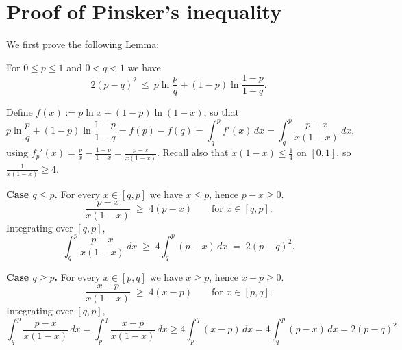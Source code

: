 \documentclass[fontsize=11pt, parskip=half]{scrartcl}
\renewcommand{\thesection}{\arabic{section}}
\begin{document}
\clearpage
\appendix
\renewcommand{\thesection}{\Alph{section}}

\section{Proof of Pinsker's inequality}\label{app:pinsker}

We first prove the following Lemma:

\begin{lemma}\label{lem:pinsker_binary}
    For $0 \leq p \leq 1$ and $0 < q < 1$ we have
    \[
        2(p-q)^2 ~\leq~ p \ln \frac{p}{q} + (1-p) \ln \frac{1-p}{1-q}.
    \]
    \end{lemma}
    
    
    
    
    Define $f(x) := p \ln x + (1-p) \ln (1-x)$, so that
    \[
    p \ln \frac{p}{q} + (1-p) \ln \frac{1-p}{1-q} = f(p) - f(q)
    = \int_q^p f'(x)\, dx
    = \int_q^p \frac{p-x}{x(1-x)}\, dx,
    \]
    using $f_p'(x) = \frac{p}{x} - \frac{1-p}{1-x} = \frac{p-x}{x(1-x)}$. Recall also that $x(1-x) \leq \tfrac14$ on $[0,1]$, so $\frac{1}{x(1-x)} \geq 4$.
    
    \textbf{Case $q \leq p$.} For every $x \in [q,p]$ we have $x \leq p$, hence $p - x \geq 0$.
    \[
    \frac{p-x}{x(1-x)} \;\geq\; 4(p-x) \qquad \text{for } x \in [q,p].
    \]
    Integrating over $[q,p]$,
    \[
    \int_q^p \frac{p-x}{x(1-x)}\, dx \;\geq\; 4 \int_q^p (p-x)\, dx \;=\; 2(p-q)^2.
    \]
    
    \textbf{Case $q \geq p$.} For every $x \in [p,q]$ we have $x \geq p$, hence $x - p \geq 0$. 
    \[
    \frac{x-p}{x(1-x)} \;\geq\; 4(x-p) \qquad \text{for } x \in [p,q].
    \]
    Integrating over $[q,p]$,
    \[
    \int_q^p \frac{p-x}{x(1-x)}\, dx
    = \int_p^q \frac{x-p}{x(1-x)}\, dx
    \geq 4 \int_p^q (x-p)\, dx
    = 4 \int_q^p (p-x)\, dx
    = 2(p-q)^2
    \]
\end{document}
